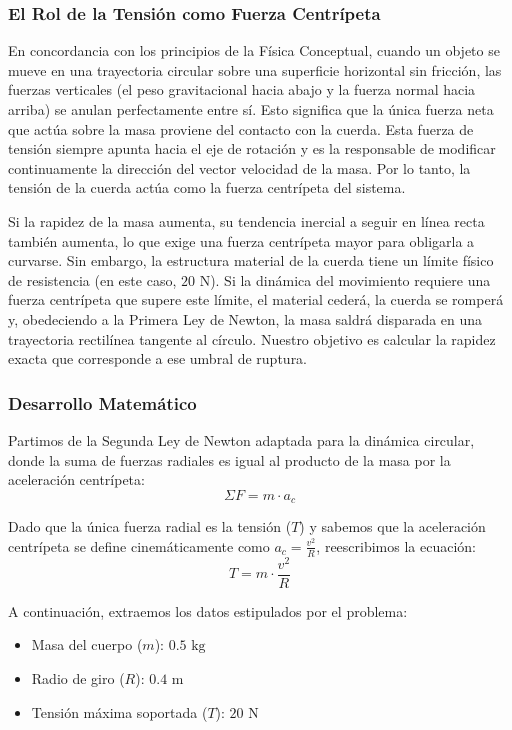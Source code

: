 \documentclass{article}
\begin{document}
\subsubsection*{El Rol de la Tensión como Fuerza Centrípeta}
En concordancia con los principios de la Física Conceptual, cuando un objeto se mueve en una trayectoria circular sobre una superficie horizontal sin fricción, las fuerzas verticales (el peso gravitacional hacia abajo y la fuerza normal hacia arriba) se anulan perfectamente entre sí. Esto significa que la única fuerza neta que actúa sobre la masa proviene del contacto con la cuerda. Esta fuerza de tensión siempre apunta hacia el eje de rotación y es la responsable de modificar continuamente la dirección del vector velocidad de la masa. Por lo tanto, la tensión de la cuerda actúa como la fuerza centrípeta del sistema.

Si la rapidez de la masa aumenta, su tendencia inercial a seguir en línea recta también aumenta, lo que exige una fuerza centrípeta mayor para obligarla a curvarse. Sin embargo, la estructura material de la cuerda tiene un límite físico de resistencia (en este caso, $20 \text{ N}$). Si la dinámica del movimiento requiere una fuerza centrípeta que supere este límite, el material cederá, la cuerda se romperá y, obedeciendo a la Primera Ley de Newton, la masa saldrá disparada en una trayectoria rectilínea tangente al círculo. Nuestro objetivo es calcular la rapidez exacta que corresponde a ese umbral de ruptura.

\subsubsection*{Desarrollo Matemático}
Partimos de la Segunda Ley de Newton adaptada para la dinámica circular, donde la suma de fuerzas radiales es igual al producto de la masa por la aceleración centrípeta:
$$\Sigma F = m \cdot a_c$$

Dado que la única fuerza radial es la tensión ($T$) y sabemos que la aceleración centrípeta se define cinemáticamente como $a_c = \frac{v^2}{R}$, reescribimos la ecuación:
$$T = m \cdot \frac{v^2}{R}$$

A continuación, extraemos los datos estipulados por el problema:
\begin{itemize}
    \item Masa del cuerpo ($m$): $0.5 \text{ kg}$
    \item Radio de giro ($R$): $0.4 \text{ m}$
    \item Tensión máxima soportada ($T$): $20 \text{ N}$
\end{itemize}
\end{document}

